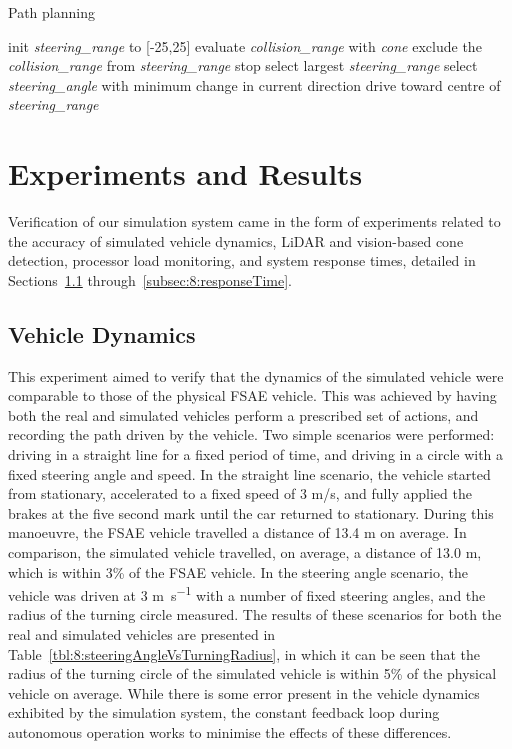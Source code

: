 \begin{algorithm}[H] %
	\caption{Path planning}\label{algo:8:cones}
	\begin{algorithmic}[1]
		\State init \textit{steering\_range} to [-25,25]
		\State evaluate \textit{collision\_range} with \textit{cone}
		\State exclude the \textit{collision\_range} from \textit{steering\_range}
		\EndFor
		\State stop
		\State select largest \textit{steering\_range}
		\State select \textit{steering\_angle} with minimum change in current direction
		\EndIf
		\State drive toward centre of \textit{steering\_range}
		\EndProcedure
	\end{algorithmic}
\end{algorithm}

\section{Experiments and Results} \label{sec:8:experimentsAndResults}
Verification of our simulation system came in the form of experiments related to the accuracy of simulated vehicle dynamics, LiDAR and vision-based cone detection, processor load monitoring, and system response times, detailed in Sections~\ref{subsec:8:vehicleDynamics} through~\ref{subsec:8:responseTime}.

\subsection{Vehicle Dynamics} \label{subsec:8:vehicleDynamics}
This experiment aimed to verify that the dynamics of the simulated vehicle were comparable to those of the physical FSAE vehicle.
This was achieved by having both the real and simulated vehicles perform a prescribed set of actions, and recording the path driven by the vehicle.
Two simple scenarios were performed: driving in a straight line for a fixed period of time, and driving in a circle with a fixed steering angle and speed.
In the straight line scenario, the vehicle started from stationary, accelerated to a fixed speed of 3 m/s, and fully applied the brakes at the five second mark until the car returned to stationary.
During this manoeuvre, the FSAE vehicle travelled a distance of 13.4 m on average.
In comparison, the simulated vehicle travelled, on average, a distance of 13.0 m, which is within 3\% of the FSAE vehicle.
In the steering angle scenario, the vehicle was driven at 3 \si{\meter\per\second} with a number of fixed steering angles, and the radius of the turning circle measured.
The results of these scenarios for both the real and simulated vehicles are presented in Table~\ref{tbl:8:steeringAngleVsTurningRadius}, in which it can be seen that the radius of the turning circle of the simulated vehicle is within 5\% of the physical vehicle on average.
While there is some error present in the vehicle dynamics exhibited by the simulation system, the constant feedback loop during autonomous operation works to minimise the effects of these differences.

